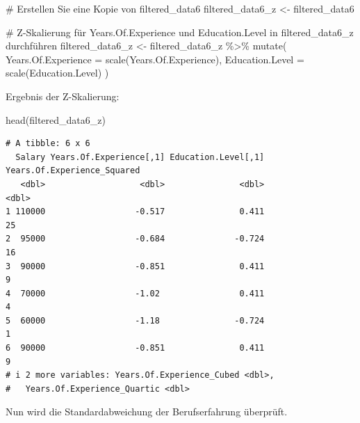 \documentclass[
  letterpaper,
  DIV=11,
  numbers=noendperiod]{scrartcl}
\newenvironment{Shaded}{\begin{snugshade}}{\end{snugshade}}
\newcommand{\AttributeTok}[1]{\textcolor[rgb]{0.40,0.45,0.13}{#1}}
\newcommand{\CommentTok}[1]{\textcolor[rgb]{0.37,0.37,0.37}{#1}}
\newcommand{\FunctionTok}[1]{\textcolor[rgb]{0.28,0.35,0.67}{#1}}
\newcommand{\NormalTok}[1]{\textcolor[rgb]{0.00,0.23,0.31}{#1}}
\newcommand{\OtherTok}[1]{\textcolor[rgb]{0.00,0.23,0.31}{#1}}
\newcommand{\SpecialCharTok}[1]{\textcolor[rgb]{0.37,0.37,0.37}{#1}}
\begin{document}
\begin{Shaded}
\begin{Highlighting}[]
\CommentTok{\# Erstellen Sie eine Kopie von filtered\_data6}
\NormalTok{filtered\_data6\_z }\OtherTok{\textless{}{-}}\NormalTok{ filtered\_data6}

\CommentTok{\# Z{-}Skalierung für Years.Of.Experience und Education.Level in filtered\_data6\_z durchführen}
\NormalTok{filtered\_data6\_z }\OtherTok{\textless{}{-}}\NormalTok{ filtered\_data6\_z }\SpecialCharTok{\%\textgreater{}\%}
  \FunctionTok{mutate}\NormalTok{(}
    \AttributeTok{Years.Of.Experience =} \FunctionTok{scale}\NormalTok{(Years.Of.Experience),}
    \AttributeTok{Education.Level =} \FunctionTok{scale}\NormalTok{(Education.Level)}
\NormalTok{  )}
\end{Highlighting}
\end{Shaded}

Ergebnis der Z-Skalierung:

\begin{Shaded}
\begin{Highlighting}[]
\FunctionTok{head}\NormalTok{(filtered\_data6\_z)}
\end{Highlighting}
\end{Shaded}

\begin{verbatim}
# A tibble: 6 x 6
  Salary Years.Of.Experience[,1] Education.Level[,1] Years.Of.Experience_Squared
   <dbl>                   <dbl>               <dbl>                       <dbl>
1 110000                  -0.517               0.411                          25
2  95000                  -0.684              -0.724                          16
3  90000                  -0.851               0.411                           9
4  70000                  -1.02                0.411                           4
5  60000                  -1.18               -0.724                           1
6  90000                  -0.851               0.411                           9
# i 2 more variables: Years.Of.Experience_Cubed <dbl>,
#   Years.Of.Experience_Quartic <dbl>
\end{verbatim}

Nun wird die Standardabweichung der Berufserfahrung überprüft.

\begin{Shaded}
\end{Shaded}
\end{document}
